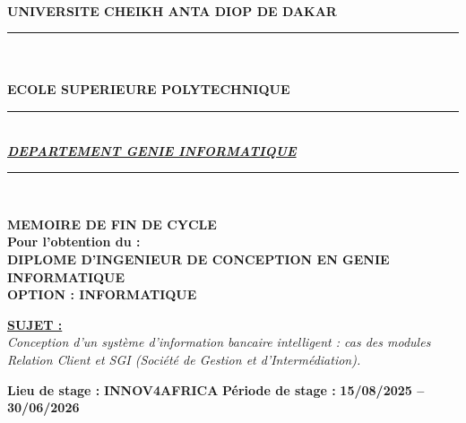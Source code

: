 \documentclass[a4paper,12pt]{report}
\begin{document}
\begin{center}
  \\[0.15cm]
  {\Large\bfseries UNIVERSITE CHEIKH ANTA DIOP DE DAKAR}\\[-0.05cm]
  {\color{red}\rule{\linewidth}{1.5pt}}\\[0.2cm]
  \\[0.05cm]
  {\small\bfseries ECOLE SUPERIEURE POLYTECHNIQUE}\\[0.15cm]
  {\color{bleuESP}\rule{\linewidth}{1pt}}\\[0.1cm]
  {\color{bleuESP}\bfseries\itshape\uline{DEPARTEMENT GENIE INFORMATIQUE}}\\[0.05cm]
  {\color{bleuESP}\rule{\linewidth}{1pt}}\\[0.2cm]

  \begin{tcolorbox}[
    enhanced,
    arc=4pt, boxrule=1.5pt,
    left=6pt, right=6pt, top=5pt, bottom=5pt,
    colback=white, colframe=bleuESP,
    halign=center,
  ]
    \textbf{\large MEMOIRE DE FIN DE CYCLE}\\[0.15cm]
    \textbf{Pour l'obtention du :}\\[0.1cm]
    \textbf{DIPLOME D'INGENIEUR DE CONCEPTION EN GENIE INFORMATIQUE}\\[0.1cm]
    \textbf{OPTION : INFORMATIQUE}
  \end{tcolorbox}
  \vspace{0.2cm}

  \begin{tcolorbox}[
    enhanced,
    arc=4pt,
    boxrule=1.5pt,
    colback=white,
    colframe=bleuESP,
    left=6pt,
    right=6pt,
    top=6pt,
    bottom=6pt,
    halign=center,
  ]
    {\large\bfseries\uline{SUJET :}}\\[0.2cm]
    {\itshape
    Conception d'un système d'information bancaire intelligent : cas des modules
    Relation Client et SGI (Société de Gestion et d'Intermédiation).}
  \end{tcolorbox}


\begin{boitestage}
    \noindent
    \textbf{Lieu de stage :} \textcolor{orangeESP}{\textbf{INNOV4AFRICA}}
    \hfill
    \textbf{Période de stage :} \textcolor{orangeESP}{\textbf{15/08/2025 -- 30/06/2026}}
    \vspace{0.05cm}
    \begin{center}
    \end{center}
    \vspace{-0.35cm}
\end{boitestage}
\end{center}
\end{document}
